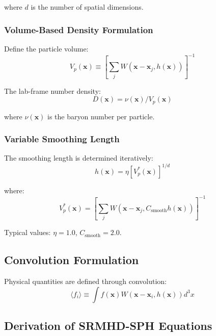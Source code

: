 \documentclass[12pt,a4paper]{article}
\begin{document}
where $d$ is the number of spatial dimensions.

\subsubsection{Volume-Based Density Formulation}

Define the particle volume:
\begin{equation}
V_p(\bm{x}) \equiv \left[\sum_j W(\bm{x} - \bm{x}_j, h(\bm{x}))\right]^{-1}
\label{eq:volume}
\end{equation}

The lab-frame number density:
\begin{equation}
D(\bm{x}) = \nu(\bm{x}) / V_p(\bm{x})
\label{eq:number_density}
\end{equation}

where $\nu(\bm{x})$ is the baryon number per particle.

\subsubsection{Variable Smoothing Length}

The smoothing length is determined iteratively:
\begin{equation}
h(\bm{x}) = \eta \left[V_p^*(\bm{x})\right]^{1/d}
\label{eq:smoothing_length}
\end{equation}

where:
\begin{equation}
V_p^*(\bm{x}) = \left[\sum_j W(\bm{x} - \bm{x}_j, C_\text{smooth} h(\bm{x}))\right]^{-1}
\label{eq:volume_star}
\end{equation}

Typical values: $\eta = 1.0$, $C_\text{smooth} = 2.0$.

\subsection{Convolution Formulation}

Physical quantities are defined through convolution:
\begin{equation}
\langle f_i \rangle \equiv \int f(\bm{x}) W(\bm{x} - \bm{x}_i, h(\bm{x})) d^3x
\label{eq:convolution}
\end{equation}

\subsection{Derivation of SRMHD-SPH Equations}
\end{document}
